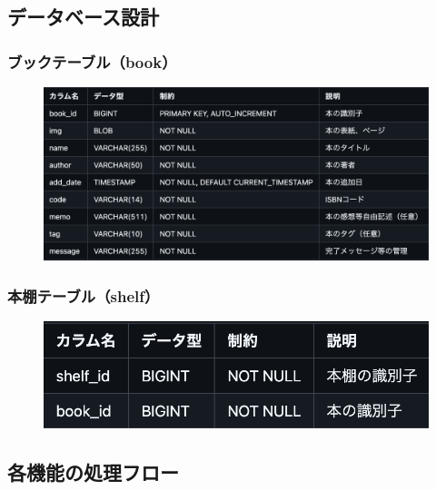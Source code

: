 \documentclass[a4paper, 11pt, titlepage]{jsarticle}
\begin{document}
\subsection{データベース設計}
\subsubsection{ブックテーブル（book）}
\begin{figure}[htbp]
\centering
\includegraphics[width=120mm]{databasebook.png}
\label{fig:func}
\end{figure}

\subsubsection{本棚テーブル（shelf）}
\begin{figure}[htbp]
\centering
\includegraphics[width=120mm]{databaseshelf.png}
\label{fig:func}
\end{figure}

\clearpage
\subsection{各機能の処理フロー}
\end{document}
